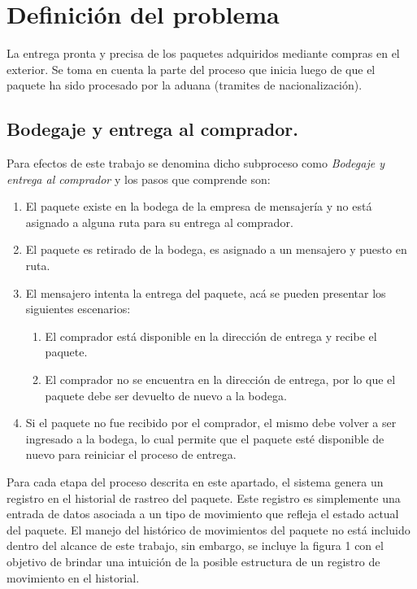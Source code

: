 \documentclass[12pt,a4paper]{article}
\begin{document}
\section{Definición del problema}
La entrega pronta y precisa de los paquetes adquiridos mediante compras en el exterior. Se toma en cuenta la parte del proceso que inicia luego de que el paquete ha sido procesado por la aduana (tramites de nacionalización).
\subsection{Bodegaje y entrega al comprador.}
Para efectos de este trabajo se denomina dicho subproceso como \textit{Bodegaje y entrega al comprador} y los pasos que comprende son:
\begin{enumerate}
\item El paquete existe en la bodega de la empresa de mensajería y no está asignado a alguna ruta para su entrega al comprador.
\item El paquete es retirado de la bodega, es asignado a un mensajero y puesto en ruta.
\item El mensajero intenta la entrega del paquete, acá se pueden presentar los siguientes escenarios:
\begin{enumerate}
\item El comprador está disponible en la dirección de entrega y recibe el paquete.
\item El comprador no se encuentra en la dirección de entrega, por lo que el paquete debe ser devuelto de nuevo a la bodega.
\end{enumerate}
\item Si el paquete no fue recibido por el comprador, el mismo debe volver a ser ingresado a la bodega, lo cual permite que el paquete esté disponible de nuevo para reiniciar el proceso de entrega.
\end{enumerate}

Para cada etapa del proceso descrita en este apartado, el sistema genera un registro en el historial de rastreo del paquete. Este registro es simplemente una entrada de datos asociada a un tipo de movimiento que refleja el estado actual del paquete. El manejo del histórico de movimientos del paquete no está incluido dentro del alcance de este trabajo, sin embargo, se incluye la figura 1 con el objetivo de brindar una intuición de la posible estructura de un registro de movimiento en el historial. 

\end{document}
